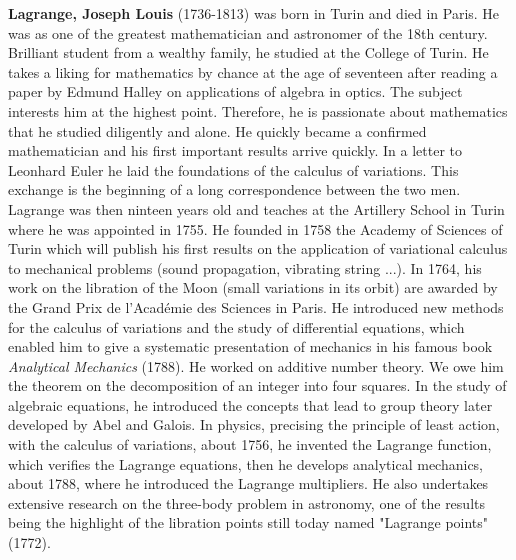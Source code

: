 \textbf{Lagrange, Joseph Louis} (1736-1813) was born in Turin and died in Paris. He was as one of the greatest mathematician and astronomer of the 18th century. Brilliant student from a wealthy family, he studied at the College of Turin. He takes a liking for mathematics by chance at the age of seventeen after reading a paper by Edmund Halley on applications of algebra in optics. The subject interests him at the highest point. Therefore, he is passionate about mathematics that he studied diligently and alone. He quickly became a confirmed mathematician and his first important results arrive quickly. In a letter to Leonhard Euler he laid the foundations of the calculus of variations. This exchange is the beginning of a long correspondence between the two men. Lagrange was then ninteen years old and teaches at the Artillery School in Turin where he was appointed in 1755. He founded in 1758 the Academy of Sciences of Turin which will publish his first results on the application of variational calculus to mechanical problems (sound propagation, vibrating string ...). In 1764, his work on the libration of the Moon (small variations in its orbit) are awarded by the Grand Prix de l'Académie des Sciences in Paris. He introduced new methods for the calculus of variations and the study of differential equations, which enabled him to give a systematic presentation of mechanics in his famous book \textit{Analytical Mechanics} (1788). He worked on additive number theory. We owe him the theorem on the decomposition of an integer into four squares. In the study of algebraic equations, he introduced the concepts that lead to group theory later developed by Abel and Galois. In physics, precising the principle of least action, with the calculus of variations, about 1756, he invented the Lagrange function, which verifies the Lagrange equations, then he develops analytical mechanics, about 1788, where he introduced the Lagrange multipliers. He also undertakes extensive research on the three-body problem in astronomy, one of the results being the highlight of the libration points still today named "Lagrange points" (1772).

